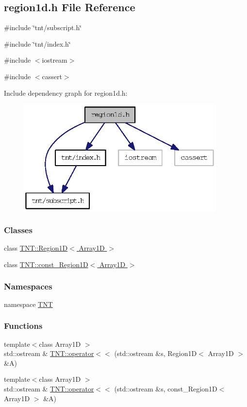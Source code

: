 \subsection{region1d.h File Reference}
\label{region1d_8h}
{\ttfamily \#include \char`\"{}tnt/subscript.h\char`\"{}}\par
{\ttfamily \#include \char`\"{}tnt/index.h\char`\"{}}\par
{\ttfamily \#include $<$iostream$>$}\par
{\ttfamily \#include $<$cassert$>$}\par
Include dependency graph for region1d.h:
\nopagebreak
\begin{figure}[H]
\begin{center}
\leavevmode
\includegraphics[width=298pt]{region1d_8h__incl}
\end{center}
\end{figure}
\subsubsection*{Classes}
\begin{DoxyCompactItemize}
\item 
class \hyperlink{class_t_n_t_1_1_region1_d}{TNT::Region1D$<$ Array1D $>$}
\item 
class \hyperlink{class_t_n_t_1_1const___region1_d}{TNT::const\_\-Region1D$<$ Array1D $>$}
\end{DoxyCompactItemize}
\subsubsection*{Namespaces}
\begin{DoxyCompactItemize}
\item 
namespace \hyperlink{namespace_t_n_t}{TNT}
\end{DoxyCompactItemize}
\subsubsection*{Functions}
\begin{DoxyCompactItemize}
\item 
{\footnotesize template$<$class Array1D $>$ }\\std::ostream \& \hyperlink{namespace_t_n_t_a9d4a420b4c7846df31034b30ba145b47}{TNT::operator$<$$<$} (std::ostream \&s, Region1D$<$ Array1D $>$ \&A)
\item 
{\footnotesize template$<$class Array1D $>$ }\\std::ostream \& \hyperlink{namespace_t_n_t_ae3af55d8815b3c1457a6db67c8ad52cf}{TNT::operator$<$$<$} (std::ostream \&s, const\_\-Region1D$<$ Array1D $>$ \&A)
\end{DoxyCompactItemize}

